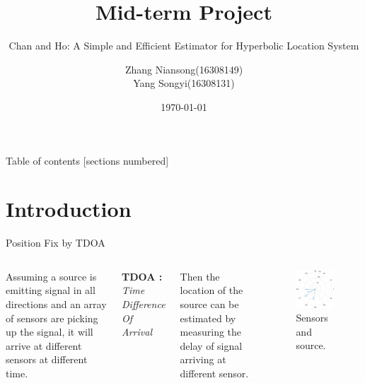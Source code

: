 \documentclass[10pt]{beamer}
\title{Mid-term Project}
\subtitle{Chan and Ho: A Simple and Efficient Estimator for Hyperbolic Location System}
\date{\today}
\author{Zhang Niansong\quad(16308149) \\ Yang Songyi\quad(16308131)}
\begin{document}
\maketitle

\begin{frame}{Table of contents}
  [sections numbered]
  \tableofcontents[hideallsubsections]
\end{frame}


\section{Introduction}

\begin{frame}{Position Fix by TDOA}
  \begin{columns}[T,onlytextwidth]
      Assuming a source is emitting signal in all directions and an array of
      sensors are picking up the signal, it will arrive at different sensors at
      different time.

      \begin{center}
        \textbf{TDOA :} \textit{Time Difference Of Arrival}
      \end{center}

      Then the location of the source can be estimated by measuring the delay of
      signal arriving at different sensor.

      \begin{figure}
        \includegraphics[width=1\textwidth]{intro.png}
        \caption{Sensors and source.}
      \end{figure}
  \end{columns}
\end{frame}
\end{document}
